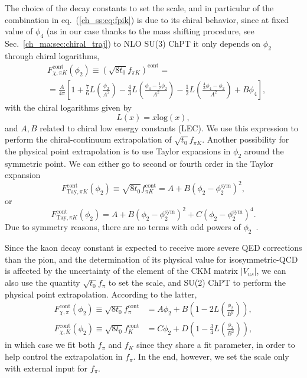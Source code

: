 The choice of the decay constants to set the scale, and in particular of the combination in eq.~(\ref{ch_ss:eq:fpik}) is due to its chiral behavior, since at fixed value of $\phi_4$ (as in our case thanks to the mass shifting procedure, see Sec.~\ref{ch_ma:sec:chiral_traj}) to NLO SU(3) ChPT it only depends on $\phi_2$ through chiral logarithms, 
\begin{align}
\label{ch_ss:eq:SU3ChPT}
&F_{\chi,\pi K}^{\textrm{cont}}(\phi_2)\equiv\left(\sqrt{8t_0}f_{\pi K}\right)^{\textrm{cont}}=\\
&=\frac{A}{4\pi}\left[1+\frac{7}{6}L\left(\frac{\phi_2}{A^2}\right)-\frac{4}{3}L\left(\frac{\phi_4-\frac{1}{2}\phi_2}{A^2}\right)-\frac{1}{2}L\left(\frac{\frac{4}{3}\phi_4-\phi_2}{A^2}\right)+B\phi_4\right],
\end{align}
with the chiral logarithms given by
\begin{equation}
\label{ch_ss:eq:log}
L(x)=x{\textrm{log}}\left(x\right),
\end{equation}
and $A,B$ related to chiral low energy constants (LEC). We use this expression to perform the chiral-continuum extrapolation of $\sqrt{t_0}f_{\pi K}$. Another possibility for the physical point extrapolation is to use Taylor expansions in $\phi_2$ around the symmetric point. We can either go to second or fourth order in the Taylor expansion
\begin{equation}
F_{\textrm{Tay},\pi K}^{\textrm{cont}}(\phi_2)\equiv\sqrt{8t_0}f_{\pi K}^{\textrm{cont}}=A+B\left(\phi_2-\phi_2^{\textrm{sym}}\right)^2,
\end{equation}
or
\begin{equation}
F_{\textrm{Tay},\pi K}^{\textrm{cont}}(\phi_2)=A+B\left(\phi_2-\phi_2^{\textrm{sym}}\right)^2+C\left(\phi_2-\phi_2^{\textrm{sym}}\right)^4.
\end{equation}
Due to symmetry reasons, there are no terms with odd powers of $\phi_2$~\cite{}.

Since the kaon decay constant is expected to receive more severe QED corrections than the pion, and the determination of its physical value for isosymmetric-QCD is affected by the uncertainty of the element of the CKM matrix $|V_{us}|$, we can also use the quantity $\sqrt{t_0}f_{\pi}$ to set the scale, and SU(2) ChPT to perform the physical point extrapolation. According to the latter,
\begin{align}
F_{\chi,\pi}^{\textrm{cont}}(\phi_2)\equiv\sqrt{8t_0}f_{\pi}^{\textrm{cont}}&=A\phi_2+B\left(1-2L\left(\frac{\phi_2}{B^2}\right)\right),\\
F_{\chi,K}^{\textrm{cont}}(\phi_2)\equiv\sqrt{8t_0}f_K^{\textrm{cont}}&=C\phi_2+D\left(1-\frac{3}{4}L\left(\frac{\phi_2}{B^2}\right)\right),
\end{align}
in which case we fit both $f_{\pi}$ and $f_K$ since they share a fit parameter, in order to help control the extrapolation in $f_{\pi}$. In the end, however, we set the scale only with external input for $f_{\pi}$.

